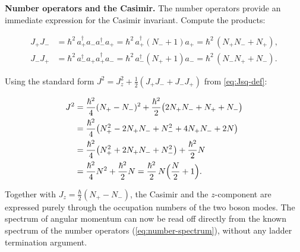 \medskip\noindent\textbf{Number operators and the Casimir.}
The number operators provide an immediate expression for the Casimir invariant. Compute the products:
\begin{linenomath}
  \begin{align*}
    J_+ J_- &= \hbar^2\,a_+^\dagger a_- a_-^\dagger a_+
            = \hbar^2\,a_+^\dagger(N_- + 1)a_+
            = \hbar^2\,(N_+ N_- + N_+), \\[4pt]
    J_- J_+ &= \hbar^2\,a_-^\dagger a_+ a_+^\dagger a_-
            = \hbar^2\,a_-^\dagger(N_+ + 1)a_-
            = \hbar^2\,(N_- N_+ + N_-).
  \end{align*}
\end{linenomath}
Using the standard form $J^2 = J_z^2 + \frac{1}{2}(J_+ J_- + J_- J_+)$ from \eqref{eq:Jsq-def}:
\begin{linenomath}
  \begin{align}
    J^2
    &= \frac{\hbar^2}{4}(N_+ - N_-)^2
       + \frac{\hbar^2}{2}\bigl(2N_+ N_- + N_+ + N_-\bigr) \notag \\
    &= \frac{\hbar^2}{4}\bigl(N_+^2 - 2N_+ N_- + N_-^2 + 4N_+ N_- + 2N\bigr) \notag \\
    &= \frac{\hbar^2}{4}\bigl(N_+^2 + 2N_+ N_- + N_-^2\bigr)
       + \frac{\hbar^2}{2}N \notag \\
    &= \frac{\hbar^2}{4}N^2 + \frac{\hbar^2}{2}N
       = \frac{\hbar^2}{2}\,N\Bigl(\frac{N}{2} + 1\Bigr).
    \label{eq:schwinger-Jsq}
  \end{align}
\end{linenomath}
Together with $J_z = \frac{\hbar}{2}(N_+ - N_-)$, the Casimir and the $z$-component are expressed purely through the occupation numbers of the two boson modes. The spectrum of angular momentum can now be read off directly from the known spectrum of the number operators (\eqref{eq:number-spectrum}), without any ladder termination argument.

